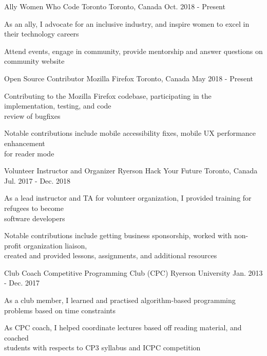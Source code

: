 \begin{cventries}
	\cventry
    {Ally}
    {Women Who Code Toronto}
    {Toronto, Canada}
    {Oct. 2018 - Present}
    {
      \begin{cvitems}
        \item {As an ally, I advocate for an inclusive industry, and inspire women to excel in their technology careers}
        \item {Attend events, engage in community, provide mentorship and answer questions on community website}
      \end{cvitems}
    }
    \cventry
    {Open Source Contributor}
    {Mozilla Firefox}
    {Toronto, Canada}
    {May 2018 - Present}
    {
      \begin{cvitems}
        \item {Contributing to the Mozilla Firefox codebase, participating in the implementation, testing, and code \\review of bugfixes}
        \item {Notable contributions include mobile accessibility fixes, mobile UX performance enhancement \\for reader mode}
      \end{cvitems}
    }
     \cventry
    {Volunteer Instructor and Organizer}
    {Ryerson Hack Your Future}
    {Toronto, Canada}
    {Jul. 2017 - Dec. 2018}
    {
      \begin{cvitems}
        \item {As a lead instructor and TA for volunteer organization, I provided training for refugees to become \\ software developers}
        \item {Notable contributions include getting business sponsorship, worked with non-profit organization liaison, \\created and provided lessons, assignments, and additional resources}
      \end{cvitems}
    }
   \cventry
    {Club Coach}
    {Competitive Programming Club (CPC)}
    {Ryerson University}
    {Jan. 2013 - Dec. 2017}
    {
      \begin{cvitems}
        \item {As a club member, I learned and practised algorithm-based programming problems based on time constraints}
        \item {As CPC coach, I helped coordinate lectures based off reading material, and coached \\students with respects to CP3 syllabus and ICPC competition}

\end{cvitems}}
\end{cventries}
